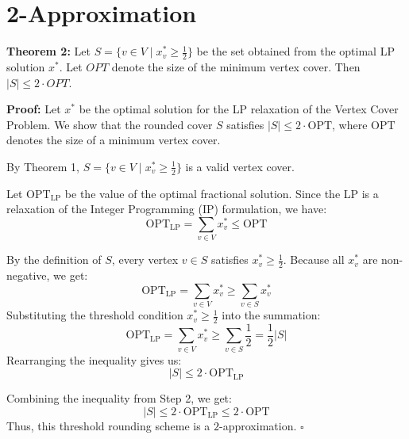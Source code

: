 \documentclass[11pt,a4paper]{article}
\begin{document}
\section{2-Approximation}
\begin{theorem}\textbf{Theorem 2:} \label{thm:feasibility}
Let $S = \{v \in V \mid x^*_v \geq \frac{1}{2}\}$ be the set obtained from the optimal LP solution $x^*$. Let $OPT$ denote the size of the minimum vertex cover. Then $|S| \leq 2 \cdot OPT$.
\end{theorem}

\noindent \textbf{Proof:}
Let $x^*$ be the optimal solution for the LP relaxation of the Vertex Cover Problem. We show that the rounded cover $S$ satisfies $|S| \leq 2 \cdot \mathrm{OPT}$, where $\mathrm{OPT}$ denotes the size of a minimum vertex cover.

By Theorem 1, $S = \{v \in V \mid x^*_v \geq \frac{1}{2}\}$ is a valid vertex cover.

Let $\text{OPT}_{\text{LP}}$ be the value of the optimal fractional solution. Since the LP is a relaxation of the Integer Programming (IP) formulation, we have:
\begin{equation}
    \text{OPT}_{\text{LP}} = \sum_{v \in V} x^*_v \leq \text{OPT}
\end{equation}

By the definition of $S$, every vertex $v \in S$ satisfies $x^*_v \geq \frac{1}{2}$. Because all $x^*_v$ are non-negative, we get:
\begin{equation}
    \text{OPT}_{\text{LP}} = \sum_{v \in V} x^*_v \geq \sum_{v \in S} x^*_v
\end{equation}
Substituting the threshold condition $x^*_v \geq \frac{1}{2}$ into the summation:
\begin{equation}
   \text{OPT}_{\text{LP}} = \sum_{v \in V} x^*_v \geq \sum_{v \in S} \frac{1}{2} = \frac{1}{2} |S|
\end{equation}
Rearranging the inequality gives us:
\begin{equation}
    |S| \leq 2 \cdot \text{OPT}_{\text{LP}}
\end{equation}

Combining the inequality from Step 2, we get:
\begin{equation}
    |S| \leq 2 \cdot \text{OPT}_{\text{LP}} \leq 2 \cdot \text{OPT}
\end{equation}
Thus, this threshold rounding scheme is a $2$-approximation. \hfill $\square$
\end{document}
